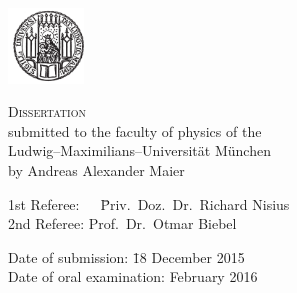 \vfill
\begin{minipage}[]{10cm}

\includegraphics[height=2cm]{./logos/lmu_siegel.pdf}

\vspace{0.5cm}

{ 
 \textsc{\Large Dissertation} \\[5mm]

  submitted to the faculty of physics of the \\
  Ludwig--Maximilians--Universit\"at M\"unchen \\[6mm]
  by Andreas Alexander Maier\\[6mm]
  \begin{tabbing}
  1st Referee:~~~\= Priv.~Doz.~Dr.~Richard Nisius\\
  2nd Referee: \> Prof.~Dr.~Otmar Biebel
  \end{tabbing} 
  \begin{tabbing}
  Date of submission: \hspace{1.5cm} \= 18 December 2015\\
  Date of oral examination:  February 2016
  \end{tabbing}

}

\end{minipage}



